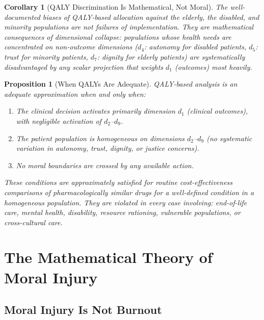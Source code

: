 \documentclass[12pt]{article}
\newtheorem{proposition}[theorem]{Proposition}
\newtheorem{corollary}[theorem]{Corollary}
\theoremstyle{definition}
\theoremstyle{remark}
\begin{document}
\begin{corollary}[QALY Discrimination Is Mathematical, Not Moral]
\label{cor:qaly_discrimination}
The well-documented biases of QALY-based allocation against the elderly, the disabled, and minority populations \cite{harris1987,nord1999} are not failures of implementation.  They are mathematical consequences of dimensional collapse: populations whose health needs are concentrated on non-outcome dimensions ($d_4$: autonomy for disabled patients, $d_5$: trust for minority patients, $d_7$: dignity for elderly patients) are systematically disadvantaged by any scalar projection that weights $d_1$ (outcomes) most heavily.
\end{corollary}

\begin{proposition}[When QALYs Are Adequate]
\label{prop:qaly_adequate}
QALY-based analysis is an adequate approximation when and only when:
\begin{enumerate}
    \item The clinical decision activates primarily dimension $d_1$ (clinical outcomes), with negligible activation of $d_2$--$d_9$.
    \item The patient population is homogeneous on dimensions $d_2$--$d_9$ (no systematic variation in autonomy, trust, dignity, or justice concerns).
    \item No moral boundaries are crossed by any available action.
\end{enumerate}
These conditions are approximately satisfied for routine cost-effectiveness comparisons of pharmacologically similar drugs for a well-defined condition in a homogeneous population.  They are violated in every case involving: end-of-life care, mental health, disability, resource rationing, vulnerable populations, or cross-cultural care.
\end{proposition}


\section{The Mathematical Theory of Moral Injury}
\label{sec:moral_injury}

\subsection{Moral Injury Is Not Burnout}
\end{document}

